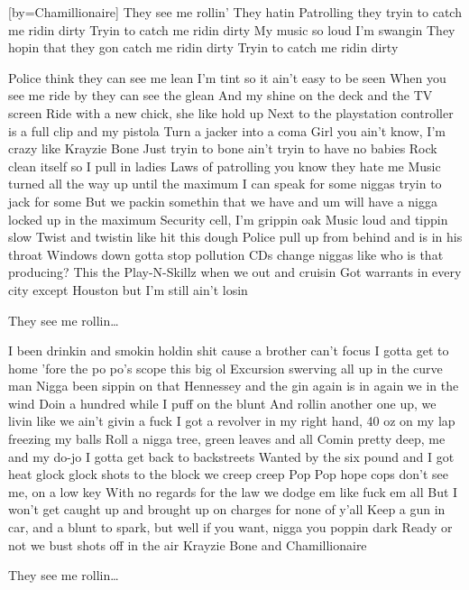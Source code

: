 [by={Chamillionaire}]
\beginchorus
They see me rollin'
They hatin
Patrolling they tryin to catch me ridin dirty
Tryin to catch me ridin dirty 
My music so loud
I'm swangin
They hopin that they gon catch me ridin dirty
Tryin to catch me ridin dirty 
\endchorus

\beginverse
Police think they can see me lean
I'm tint so it ain't easy to be seen
When you see me ride by they can see the glean
And my shine on the deck and the TV screen
Ride with a new chick, she like hold up
Next to the playstation controller is a full clip and my pistola
Turn a jacker into a coma
Girl you ain't know, I'm crazy like Krayzie Bone
Just tryin to bone ain't tryin to have no babies
Rock clean itself so I pull in ladies
Laws of patrolling you know they hate me
Music turned all the way up until the maximum
I can speak for some niggas tryin to jack for some
But we packin somethin that we have and um will have a nigga locked up in the maximum
Security cell, I'm grippin oak
Music loud and tippin slow
Twist and twistin like hit this dough
Police pull up from behind and is in his throat
Windows down gotta stop pollution
CDs change niggas like who is that producing?
This the Play-N-Skillz when we out and cruisin
Got warrants in every city except Houston but I'm still ain't losin
\endverse

\beginchorus
They see me rollin\dots
\endchorus

\beginverse 
I been drinkin and smokin holdin shit cause a brother can't focus
I gotta get to home 'fore the po po's scope this big ol Excursion swerving all up in the curve man
Nigga been sippin on that Hennessey and the gin again is in again we in the wind
Doin a hundred while I puff on the blunt
And rollin another one up, we livin like we ain't givin a fuck
I got a revolver in my right hand, 40 oz on my lap freezing my balls
Roll a nigga tree, green leaves and all
Comin pretty deep, me and my do-jo
I gotta get back to backstreets
Wanted by the six pound and I got heat glock glock shots to the block we creep creep
Pop Pop hope cops don't see me, on a low key
With no regards for the law we dodge em like fuck em all
But I won't get caught up and brought up on charges for none of y'all
Keep a gun in car, and a blunt to spark, but well if you want, nigga you poppin dark
Ready or not we bust shots off in the air Krayzie Bone and Chamillionaire
\endverse

\beginchorus
They see me rollin\dots
\endchorus

